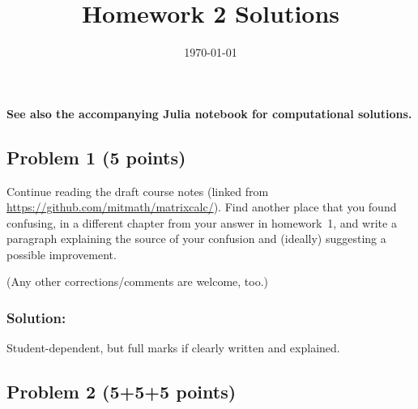 \documentclass[10pt,oneside]{article}
\author{}
\title{Homework 2 Solutions}
\date{\today}
\begin{document}
%
%

\maketitle
\thispagestyle{fancy} 

{\bf See also the accompanying Julia notebook for computational solutions.  }

\subsection*{Problem 1 (5 points)}

Continue reading the draft course notes (linked from \url{https://github.com/mitmath/matrixcalc/}).   Find another place that you found confusing, in a different chapter from your answer in homework~1, and write a paragraph explaining the source of your confusion and (ideally) suggesting a possible improvement.

(Any other corrections/comments are welcome, too.)

\subsubsection*{Solution:}

Student-dependent, but full marks if clearly written and explained.

\subsection*{Problem 2  (5+5+5 points)}
\end{document}
